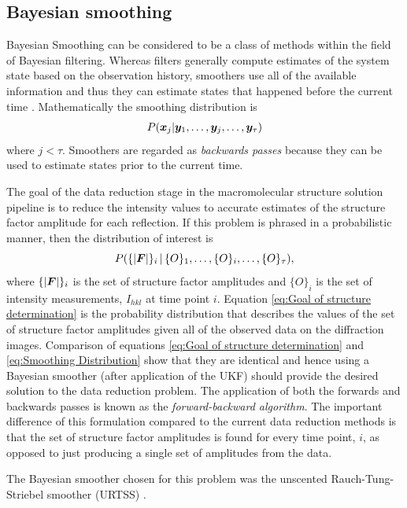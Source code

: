 \subsection{Bayesian smoothing}
\label{sub:Bayesian Smoothing}
Bayesian Smoothing can be considered to be a class of methods within the field of Bayesian filtering.
Whereas filters generally compute estimates of the system state based on the observation history, smoothers use all of the available information and thus they can estimate states that happened before the current time \cite{sarkka2013}.
Mathematically the smoothing distribution is
\begin{equation}
    P(\boldsymbol{x}_j | \boldsymbol{y}_1, \ldots, \boldsymbol{y}_j, \ldots, \boldsymbol{y}_{\tau})
    \label{eq:Smoothing Distribution}
\end{equation}
where $j < \tau$.
Smoothers are regarded as \textit{backwards passes} because they can be used to estimate states prior to the current time.

The goal of the data reduction stage in the macromolecular structure solution pipeline is to reduce the intensity values to accurate estimates of the structure factor amplitude for each reflection.
If this problem is phrased in a probabilistic manner, then the distribution of interest is
\begin{equation}
    P(\{|\boldsymbol{F}|\}_i \,|\, \{O\}_1, \ldots, \{O\}_i,\ldots, \{O\}_{\tau}),
    \label{eq:Goal of structure determination}
\end{equation}
where $\{|\boldsymbol{F}|\}_i$ is the set of structure factor amplitudes and $\{O\}_i$ is the set of intensity measurements, $I_{hkl}$ at time point $i$.
Equation \ref{eq:Goal of structure determination} is the probability distribution that describes the values of the set of structure factor amplitudes given all of the observed data on the diffraction images.
Comparison of equations \ref{eq:Goal of structure determination} and \ref{eq:Smoothing Distribution} show that they are identical and hence using a Bayesian smoother (after application of the UKF) should provide the desired solution to the data reduction problem.
The application of both the forwards and backwards passes is known as the \textit{forward-backward algorithm}.
The important difference of this formulation compared to the current data reduction methods is that the set of structure factor amplitudes is found for every time point, $i$, as opposed to just producing a single set of amplitudes from the data.

The Bayesian smoother chosen for this problem was the unscented Rauch-Tung-Striebel smoother (URTSS) \cite{sarkka2008unscented}.

